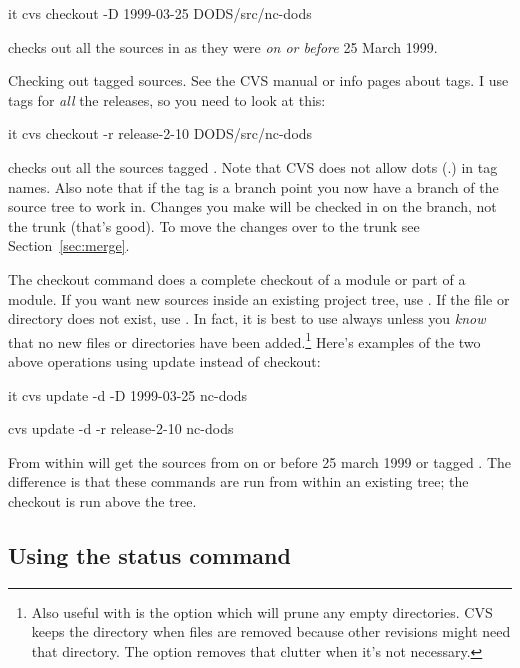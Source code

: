 \documentclass{dods-paper}
\begin{document}
\begin{vcode}{it}
cvs checkout -D 1999-03-25 DODS/src/nc-dods
\end{vcode}

checks out all the sources in  as they were \emph{on or
before} 25 March 1999.

Checking out tagged sources. See the CVS manual or info pages about tags. I
use tags for \emph{all} the releases, so you need to look at this:

\begin{vcode}{it}
cvs checkout -r release-2-10 DODS/src/nc-dods
\end{vcode}

checks out all the sources tagged . Note that CVS does not
allow dots (.) in tag names. Also note that if the tag is a branch point you
now have a branch of the source tree to work in. Changes you make will be
checked in on the branch, not the trunk (that's good). To move the changes
over to the trunk see Section~\ref{sec:merge}.

The checkout command does a complete checkout of a module or part of a
module. If you want new sources inside an existing project tree, use
. If the file or directory does not exist, use .
In fact, it is best to use  always unless you \emph{know} that
no new files or directories have been added.\footnote{Also useful with
 is the  option which will prune any empty directories.
CVS keeps the directory when files are removed because other revisions might
need that directory. The  option removes that clutter when it's not
necessary.} Here's examples of the two above operations using update instead
of checkout:

\begin{vcode}{it}
cvs update -d -D 1999-03-25 nc-dods

cvs update -d -r release-2-10 nc-dods
\end{vcode}

From within  will get the  sources from on or
before 25 march 1999 or tagged . The difference is that
these commands are run from within an existing tree; the checkout is run
above the tree.

\subsection{Using the status command}
\end{document}
